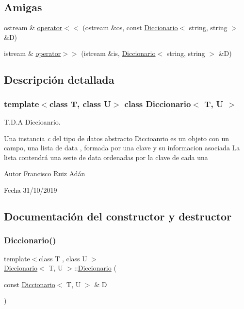 \subsection*{Amigas}
\begin{DoxyCompactItemize}
\item 
ostream \& \hyperlink{classDiccionario_a2df23b649675001c9287783c5ba5de7f}{operator$<$$<$} (ostream \&os, const \hyperlink{classDiccionario}{Diccionario}$<$ string, string $>$ \&D)
\item 
istream \& \hyperlink{classDiccionario_ad641af7266310b3ad1491ba4268cbb79}{operator$>$$>$} (istream \&is, \hyperlink{classDiccionario}{Diccionario}$<$ string, string $>$ \&D)
\end{DoxyCompactItemize}


\subsection{Descripción detallada}
\subsubsection*{template$<$class T, class U$>$\newline
class Diccionario$<$ T, U $>$}

T.\+D.\+A Diccioanrio. 

Una instancia {\itshape c} del tipo de datos abstracto {\ttfamily Diccioanrio} es un objeto con un campo, una {\ttfamily lista} de {\ttfamily data} , formada por una clave y su informacion asociada La lista contendrá una serie de {\ttfamily data} ordenadas por la clave de cada una

\begin{DoxyAuthor}{Autor}
Francisco Ruiz Adán 
\end{DoxyAuthor}
\begin{DoxyDate}{Fecha}
31/10/2019 
\end{DoxyDate}


\subsection{Documentación del constructor y destructor}
\mbox{\label{classDiccionario_ad8917f4e401b473139403dc5964e8307}} 
\subsubsection{\texorpdfstring{Diccionario()}{Diccionario()}}
{\footnotesize\ttfamily template$<$class T , class U $>$ \\
\hyperlink{classDiccionario}{Diccionario}$<$ T, U $>$\+::\hyperlink{classDiccionario}{Diccionario} (\begin{DoxyParamCaption}\item[{const \hyperlink{classDiccionario}{Diccionario}$<$ T, U $>$ \&}]{D }\end{DoxyParamCaption})}



